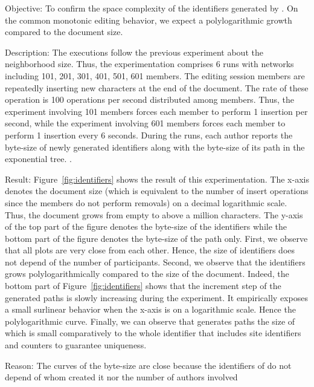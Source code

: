 \begin{asparadesc}
\item [Objective:] To confirm the space complexity of the identifiers generated
  by \LSEQ. On the common monotonic editing behavior, we expect a
  polylogarithmic growth compared to the document size.
\item [Description:] The executions follow the previous experiment about the
  neighborhood size. Thus, the experimentation comprises 6 runs with networks
  including 101, 201, 301, 401, 501, 601 members. The editing session members
  are repeatedly inserting new characters at the end of the document. The rate
  of these operation is 100 operations per second distributed among
  members. Thus, the experiment involving 101 members forces each member to
  perform 1 insertion per second, while the experiment involving 601 members
  forces each member to perform 1 insertion every 6 seconds. During the runs,
  each author reports the byte-size of newly generated identifiers along with
  the byte-size of its path in the exponential tree. .
\item [Result:] Figure~\ref{fig:identifiers} shows the result of this
  experimentation. The x-axis denotes the document size (which is equivalent to
  the number of insert operations since the members do not perform removals) on
  a decimal logarithmic scale. Thus, the document grows from empty to above a
  million characters. The y-axis of the top part of the figure denotes the
  byte-size of the identifiers while the bottom part of the figure denotes the
  byte-size of the path only. First, we observe that all plots are very close
  from each other. Hence, the size of identifiers does not depend of the number
  of participants. Second, we observe that the identifiers grows
  polylogarithmically compared to the size of the document. Indeed, the bottom
  part of Figure~\ref{fig:identifiers} shows that the increment step of the
  generated paths is slowly increasing during the experiment. It empirically
  exposes a small surlinear behavior when the x-axis is on a logarithmic
  scale. Hence the polylogarithmic curve. Finally, we can observe that \LSEQ
  generates paths the size of which is small comparatively to the whole
  identifier that includes site identifiers and counters to guarantee
  uniqueness.
\item [Reason:] The curves of the byte-size are close because the identifiers
  of \LSEQ do not depend of whom created it nor the number of authors involved

\end{asparadesc}
